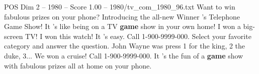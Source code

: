 \begin{textsample}{POS Dim 2 – 1980 – Score 1.00 – 1980/tv\_com\_1980\_96.txt}  \label{ex:f2_pos_070}
Want to win fabulous prizes on your phone?
Introducing the all-new Winner 's Telephone Game Show!
It 's like being on a TV \textbf{game} show in your own home!
I won a big-screen TV!
I won this watch!
It 's easy.
Call 1-900-9999-000.
Select your favorite category and answer the question.
John Wayne was press 1 for the king, 2 the duke, 3...
We won a cruise!
Call 1-900-9999-000.
It 's the fun of a \textbf{game} show with fabulous prizes all at home on your phone.

\end{textsample}
